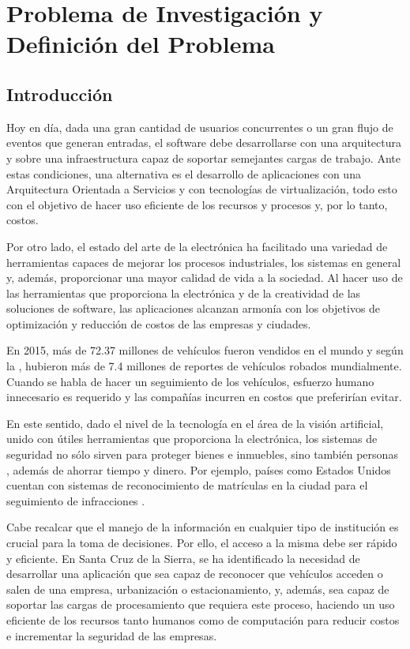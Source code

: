 \chapter{Problema de Investigación y Definición del Problema}
\section{Introducción}

    Hoy en día, dada una gran cantidad de usuarios concurrentes o un gran flujo de eventos que generan entradas, el software debe desarrollarse con una arquitectura y sobre una infraestructura capaz de soportar semejantes cargas de trabajo. Ante estas condiciones, una alternativa es el desarrollo de aplicaciones con una Arquitectura Orientada a Servicios y con tecnologías de virtualización, todo esto con el objetivo de hacer uso eficiente de los recursos y procesos y, por lo tanto, costos.
    
    Por otro lado, el estado del arte de la electrónica ha facilitado una variedad de herramientas capaces de mejorar los procesos industriales, los sistemas en general y, además, proporcionar una mayor calidad de vida a la sociedad. Al hacer uso de las herramientas que proporciona la electrónica y de la creatividad de las soluciones de software, las aplicaciones alcanzan armonía con los objetivos de optimización y reducción de costos de las empresas y ciudades. 
    
    En 2015, más de 72.37 millones de vehículos fueron vendidos en el mundo \cite{Statista2016-qw} y según la , hubieron más de 7.4 millones de reportes de vehículos robados mundialmente. Cuando se habla de hacer un seguimiento de los vehículos, esfuerzo humano innecesario es requerido y las compañías incurren en costos que preferirían evitar.
    
    En este sentido, dado el nivel de la tecnología en el área de la visión artificial, unido con útiles herramientas que proporciona la electrónica, los sistemas de seguridad no sólo sirven para proteger bienes e inmuebles, sino también personas , además de ahorrar tiempo y dinero. Por ejemplo, países como Estados Unidos cuentan con sistemas de reconocimiento de matrículas en la ciudad para el seguimiento de infracciones \cite{ACLU2016}. 
    
    Cabe recalcar que el manejo de la información en cualquier tipo de institución es crucial para la toma de decisiones. Por ello, el acceso a la misma debe ser rápido y eficiente. En Santa Cruz de la Sierra, se ha identificado la necesidad de desarrollar una aplicación que sea capaz de reconocer que vehículos acceden o salen de una empresa, urbanización o estacionamiento, y, además, sea capaz de soportar las cargas de procesamiento que requiera este proceso, haciendo un uso eficiente de los recursos tanto humanos como de computación para reducir costos e incrementar la seguridad de las empresas.
